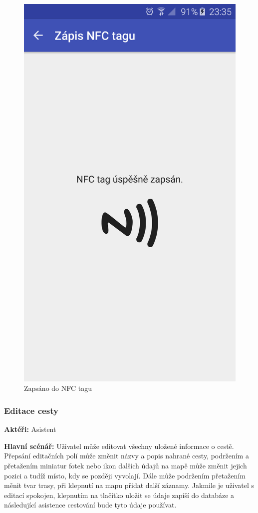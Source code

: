 \documentclass{article}
\newcommand{\usecase}[2]{\subsubsection{#1}\label{#2}}
\begin{document}
\begin{figure}[H]
\begin{minipage}{.5\textwidth}
                    \includegraphics[scale=0.14]{img/screen/zapisdonfc.png}
            \caption{Zapsáno do NFC tagu}
            \label{fig:nfczapsano}

       \end{minipage}
\end{figure}



\usecase{Editace cesty}{editacecesty}
\textbf{Aktéři:} Asistent

\vspace{0.1cm}
\noindent
\textbf{Hlavní scénář:} Uživatel může editovat všechny uložené informace o cestě. Přepsání editačních
polí může změnit názvy a popis nahrané cesty, podržením a přetažením miniatur fotek nebo ikon dalších údajů na mapě může změnit
jejich pozici a tudíž místo, kdy se později vyvolají. Dále může podržením přetažením měnit tvar trasy,
při klepnutí na mapu přidat další záznamy. Jakmile je uživatel s editací spokojen, klepnutím na tlačítko
uložit se údaje zapíší do databáze a následující asistence cestování bude tyto údaje používat.
\end{document}
